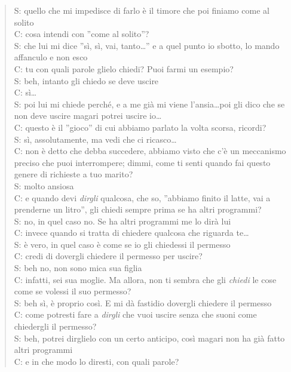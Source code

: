 \begin{verse}
S: quello che mi impedisce di farlo è il timore che poi finiamo come al solito\\
C: cosa intendi con ''come al solito''?\\
S: che lui mi dice ''sì, sì, vai, tanto\dots'' e a quel punto io sbotto, lo mando affanculo e non esco\\
C: tu con quali parole glielo chiedi? Puoi farmi un esempio?\\
S: beh, intanto gli chiedo se deve uscire\\
C: sì\dots\\
S: poi lui mi chiede perché, e a me già mi viene l'ansia\dots poi gli dico che se non deve uscire magari potrei uscire io\dots\\
C: questo è il ''gioco'' di cui abbiamo parlato la volta scorsa, ricordi?\\
S: sì, assolutamente, ma vedi che ci ricasco\ldots\\
C: non è detto che debba succedere, abbiamo visto che c'è un meccanismo preciso che puoi interrompere; dimmi, come ti senti quando fai questo genere di richieste a tuo marito?\\
S: molto ansiosa\\
C: e quando devi \emph{dirgli} qualcosa, che so, ''abbiamo finito il latte, vai a prenderne un litro'', gli chiedi sempre prima se ha altri programmi?\\
S: no, in quel caso no. Se ha altri programmi me lo dirà lui\\
C: invece quando si tratta di chiedere qualcosa che riguarda te\dots\\
S: è vero, in quel caso è come se io gli chiedessi il permesso\\
C: credi di dovergli chiedere il permesso per uscire?\\
S: beh no, non sono mica sua figlia\\
C: infatti, sei sua moglie. Ma allora, non ti sembra che gli \emph{chiedi} le cose come se volessi il suo permesso?\\
S: beh sì, è proprio così. E mi dà fastidio dovergli chiedere il permesso\\
C: come potresti fare a \emph{dirgli} che vuoi uscire senza che suoni come chiedergli il permesso?\\
S: beh, potrei dirglielo con un certo anticipo, così magari non ha già fatto altri programmi\\
C: e in che modo lo diresti, con quali parole?\\
\end{verse}

